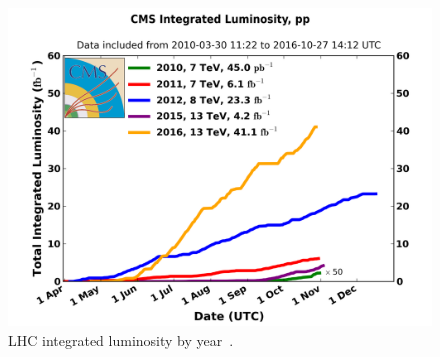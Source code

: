 \begin{figure}
  \centering
  \includegraphics[width=.80\linewidth]{../figs/Exp/int_lumi_cumulative_pp_2.png}
  \caption{LHC integrated luminosity by year~\cite{ref_fig_LHClumi}.}
  \label{fig:LHClumi}
\end{figure}

